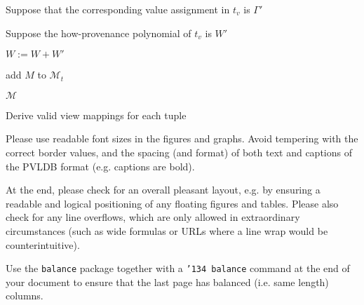\begin{appendix}
\begin{algorithm}[h!]
{{        
        {
        
        	Suppose that the corresponding value assignment in $t_v$ is $\Gamma'$
            
            {
                
                Suppose the how-provenance polynomial of $t_v$ is $W'$
                
                {
                	$W := W + W'$
                }
            }
        }
        
        {
        	add $M$ to $\mathcal{M}_t$
        }
        
        
    }
 }
 \Return $\mathcal{M}$
 \caption{Derive valid view mappings for each tuple}
 \label{view_mapping_tuple_level}
 \end{algorithm}


Please use readable font sizes in the figures and graphs. Avoid tempering with the correct border values, and the spacing (and format) of both text and captions of the PVLDB format (e.g. captions are bold).

At the end, please check for an overall pleasant layout, e.g. by ensuring a readable and logical positioning of any floating figures and tables. Please also check for any line overflows, which are only allowed in extraordinary circumstances (such as wide formulas or URLs where a line wrap would be counterintuitive).

Use the \texttt{balance} package together with a \texttt{\char'134 balance} command at the end of your document to ensure that the last page has balanced (i.e. same length) columns.

\end{appendix}